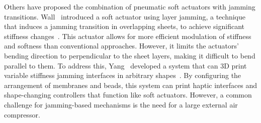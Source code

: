 Others have proposed the combination of pneumatic soft actuators with jamming transitions. 
Wall \etal\ introduced a soft actuator using layer jamming, a technique that induces a jamming transition in overlapping sheets, to achieve significant stiffness changes~\cite{layerjaming}. 
This actuator allows for more efficient modulation of stiffness and softness than conventional approaches. 
However, it limits the actuators' bending direction to perpendicular to the sheet layers, making it difficult to bend parallel to them.
To address this, Yang \etal\ developed a system that can 3D print variable stiffness jamming interfaces in arbitrary shapes~\cite{MultiJam}. 
By configuring the arrangement of membranes and beads, this system can print haptic interfaces and shape-changing controllers that function like soft actuators.
However, a common challenge for jamming-based mechanisms is the need for a large external air compressor.

